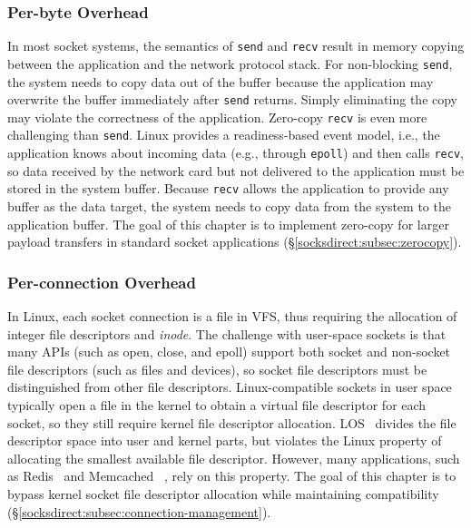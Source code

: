 \subsubsection{Per-byte Overhead}
\label{socksdirect:subsec:per-byte-overhead}

In most socket systems, the semantics of \texttt {send} and \texttt {recv} result in memory copying between the application and the network protocol stack. For non-blocking \texttt {send}, the system needs to copy data out of the buffer because the application may overwrite the buffer immediately after \texttt {send} returns. Simply eliminating the copy may violate the correctness of the application. Zero-copy \texttt {recv} is even more challenging than \texttt {send}. Linux provides a readiness-based event model, i.e., the application knows about incoming data (e.g., through \texttt {epoll}) and then calls \texttt {recv}, so data received by the network card but not delivered to the application must be stored in the system buffer. Because \texttt {recv} allows the application to provide any buffer as the data target, the system needs to copy data from the system to the application buffer. The goal of this chapter is to implement zero-copy for larger payload transfers in standard socket applications (\S\ref{socksdirect:subsec:zerocopy}).

\subsubsection{Per-connection Overhead}
\label{socksdirect:subsec:per-connection-overhead}

In Linux, each socket connection is a file in VFS, thus requiring the allocation of integer file descriptors and \emph {inode}.
The challenge with user-space sockets is that many APIs (such as open, close, and epoll) support both socket and non-socket file descriptors (such as files and devices), so socket file descriptors must be distinguished from other file descriptors.
Linux-compatible sockets in user space \cite {libvma,rsockets} typically open a file in the kernel to obtain a virtual file descriptor for each socket, so they still require kernel file descriptor allocation.
LOS~ \cite {huang2017high} divides the file descriptor space into user and kernel parts, but violates the Linux property of allocating the smallest available file descriptor.
However, many applications, such as Redis~ \cite {redis} and Memcached~ \cite {memcached}, rely on this property.
The goal of this chapter is to bypass kernel socket file descriptor allocation while maintaining compatibility (\S\ref{socksdirect:subsec:connection-management}).

